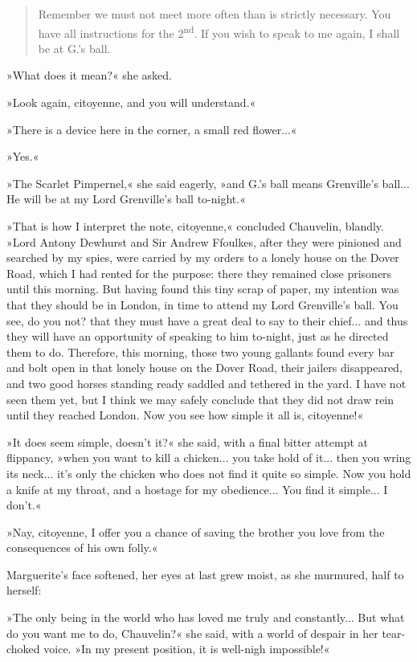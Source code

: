 \blockquote{Remember we must not meet more often than is strictly necessary. You have all instructions for the 2\textsuperscript{nd}. If you wish to speak to me again, I shall be at G.'s ball.}

»What does it mean?« she asked.

»Look again, citoyenne, and you will understand.«

»There is a device here in the corner, a small red flower...«

»Yes.«

»The Scarlet Pimpernel,« she said eagerly, »and G.'s ball means Grenville's ball... He will be at my Lord Grenville's ball to-night.«

»That is how I interpret the note, citoyenne,« concluded Chauvelin, blandly. »Lord Antony Dewhurst and Sir Andrew Ffoulkes, after they were pinioned and searched by my spies, were carried by my orders to a lonely house on the Dover Road, which I had rented for the purpose: there they remained close prisoners until this morning. But having found this tiny scrap of paper, my intention was that they should be in London, in time to attend my Lord Grenville's ball. You see, do you not? that they must have a great deal to say to their chief... and thus they will have an opportunity of speaking to him to-night, just as he directed them to do. Therefore, this morning, those two young gallants found every bar and bolt open in that lonely house on the Dover Road, their jailers disappeared, and two good horses standing ready saddled and tethered in the yard. I have not seen them yet, but I think we may safely conclude that they did not draw rein until they reached London. Now you see how simple it all is, citoyenne!«

»It does seem simple, doesn't it?« she said, with a final bitter attempt at flippancy, »when you want to kill a chicken... you take hold of it... then you wring its neck... it's only the chicken who does not find it quite so simple. Now you hold a knife at my throat, and a hostage for my obedience... You find it simple... I don't.«

»Nay, citoyenne, I offer you a chance of saving the brother you love from the consequences of his own folly.«

Marguerite's face softened, her eyes at last grew moist, as she murmured, half to herself:

»The only being in the world who has loved me truly and constantly... But what do you want me to do, Chauvelin?« she said, with a world of despair in her tear-choked voice. »In my present position, it is well-nigh impossible!«

